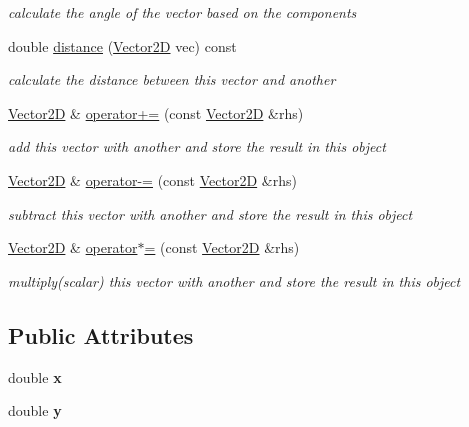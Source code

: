 \begin{DoxyCompactItemize}
\begin{DoxyCompactList}\small\item\em calculate the angle of the vector based on the components \end{DoxyCompactList}\item 
double \hyperlink{structrigid2d_1_1Vector2D_a929393171d0ac3cc0a3f438d9a2c9cf1}{distance} (\hyperlink{structrigid2d_1_1Vector2D}{Vector2D} vec) const
\begin{DoxyCompactList}\small\item\em calculate the distance between this vector and another \end{DoxyCompactList}\item 
\hyperlink{structrigid2d_1_1Vector2D}{Vector2D} \& \hyperlink{structrigid2d_1_1Vector2D_aa17e3466179575f598b77153cbfea9e6}{operator+=} (const \hyperlink{structrigid2d_1_1Vector2D}{Vector2D} \&rhs)
\begin{DoxyCompactList}\small\item\em add this vector with another and store the result in this object \end{DoxyCompactList}\item 
\hyperlink{structrigid2d_1_1Vector2D}{Vector2D} \& \hyperlink{structrigid2d_1_1Vector2D_a8ef35cca4a51ecd76bee8b8dca5e3a63}{operator-\/=} (const \hyperlink{structrigid2d_1_1Vector2D}{Vector2D} \&rhs)
\begin{DoxyCompactList}\small\item\em subtract this vector with another and store the result in this object \end{DoxyCompactList}\item 
\hyperlink{structrigid2d_1_1Vector2D}{Vector2D} \& \hyperlink{structrigid2d_1_1Vector2D_a0da46fe8a92fcb6ecea09425c6ead294}{operator$\ast$=} (const \hyperlink{structrigid2d_1_1Vector2D}{Vector2D} \&rhs)
\begin{DoxyCompactList}\small\item\em multiply(scalar) this vector with another and store the result in this object \end{DoxyCompactList}\end{DoxyCompactItemize}
\subsection*{Public Attributes}
\begin{DoxyCompactItemize}
\item 
\mbox{\label{structrigid2d_1_1Vector2D_a1876d655fe2da548c4813777c450845c}} 
double {\bfseries x}
\item 
\mbox{\label{structrigid2d_1_1Vector2D_aa814ea37ffe4a161b0020609580e4d17}} 
double {\bfseries y}
\end{DoxyCompactItemize}


